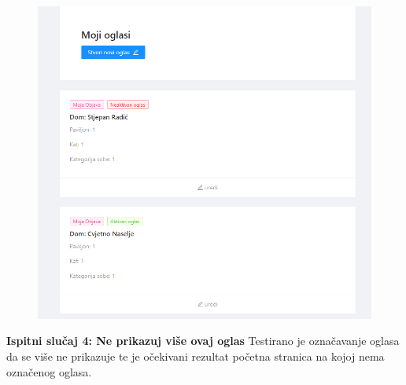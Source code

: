 			\begin{figure}[H]
				\includegraphics[scale=0.6]{slike/test10pompom.PNG} %
				\centering
				\label{fig:test10pom}
			\end{figure}
			
			\textbf{Ispitni slučaj 4: Ne prikazuj više ovaj oglas}	
			Testirano je označavanje oglasa da se više ne prikazuje te je očekivani rezultat početna stranica na kojoj nema označenog oglasa.
			
